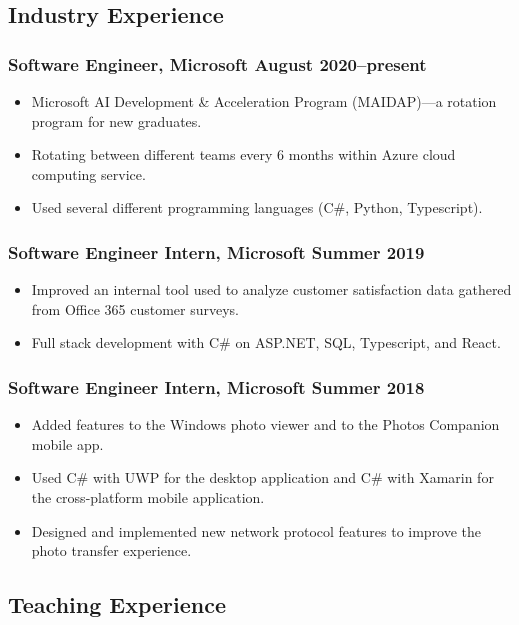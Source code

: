 \documentclass{article}
\begin{document}
	\subsection*{Industry Experience}
		\subsubsection*{Software Engineer, Microsoft \hfill \normalfont \normalsize August 2020--present}
		\begin{itemize}[leftmargin=40pt]
			\item Microsoft AI Development \& Acceleration Program (MAIDAP)---a rotation program for new graduates.
			\item Rotating between different teams every 6 months within Azure cloud computing service.
			\item Used several different programming languages (C\#, Python, Typescript).
		\end{itemize}
		\subsubsection*{Software Engineer Intern, Microsoft \hfill \normalfont \normalsize Summer 2019}
		\begin{itemize}[leftmargin=40pt]
			\item Improved an internal tool used to analyze customer satisfaction data gathered from Office 365 customer surveys.
			\item Full stack development with C\# on ASP.NET, SQL, Typescript, and React.
		\end{itemize}
		\subsubsection*{Software Engineer Intern, Microsoft \hfill \normalfont \normalsize Summer 2018}
		\begin{itemize}[leftmargin=40pt]
			\item Added features to the Windows photo viewer and to the Photos Companion mobile app.
			\item Used C\# with UWP for the desktop application and C\# with Xamarin for the cross-platform mobile application.
			\item Designed and implemented new network protocol features to improve the photo transfer experience.
		\end{itemize}
	
	\subsection*{Teaching Experience}
\end{document}
